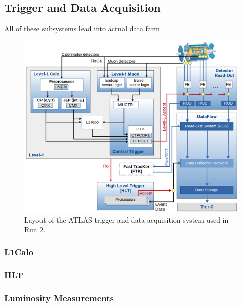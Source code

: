 \subsection{Trigger and Data Acquisition}
All of these subsystems lead into actual data farm
\begin{figure}[h!]
	\centering
	\includegraphics[width=\columnwidth]{../ThesisImages/LHCImages/ATLASTDAQR2.png}
	\caption{Layout of the ATLAS trigger and data acquisition system used in Run 2.\cite{ATLASTDAQ}
	}
	\label{fig:ATLAStdaq}
\end{figure}

\subsubsection{L1Calo}
\subsubsection{HLT}
\subsubsection{Luminosity Measurements}

